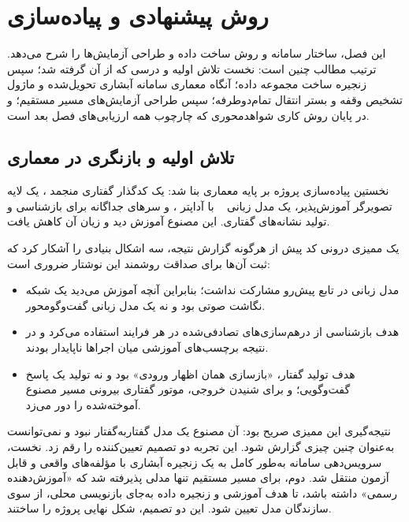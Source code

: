 
\chapter{روش پیشنهادی و پیاده‌سازی}
\label{ch:method}

این فصل، ساختار سامانه و روش ساخت داده و طراحی آزمایش‌ها را شرح می‌دهد.
ترتیب مطالب چنین است: نخست تلاش اولیه و درسی که از آن گرفته شد؛ سپس
زنجیره ساخت مجموعه داده؛ آنگاه معماری سامانه آبشاری تحویل‌شده و ماژول
تشخیص وقفه و بستر انتقال تمام‌دوطرفه؛ سپس طراحی آزمایش‌های مسیر مستقیم؛ و
در پایان روش کاری شواهد‌محوری که چارچوب همه ارزیابی‌های فصل بعد است.

\section{تلاش اولیه و بازنگری در معماری}
\label{sec:early-attempt}

نخستین پیاده‌سازی پروژه بر پایه معماری  بنا شد: یک کدگذار
گفتاری منجمد ، یک لایه تصویرگر آموزش‌پذیر، یک مدل زبانی
~\cite{qwen2025qwen25} با آداپتر ، و سرهای جداگانه برای بازشناسی و
تولید نشانه‌های گفتاری. این مصنوع آموزش دید و زیان آن کاهش یافت.

یک ممیزی درونی کد پیش از هرگونه گزارش نتیجه، سه اشکال بنیادی را آشکار کرد
که ثبت آن‌ها برای صداقت روشمند این نوشتار ضروری است:

\begin{itemize}
\item مدل زبانی در تابع پیش‌رو مشارکت نداشت؛ بنابراین آنچه آموزش می‌دید یک
      شبکه نگاشت صوتی بود و نه یک مدل زبانی گفت‌وگو‌محور.
\item هدف بازشناسی از درهم‌سازی‌های تصادفی‌شده در هر فرایند استفاده می‌کرد و
      در نتیجه برچسب‌های آموزشی میان اجراها ناپایدار بودند.
\item هدف تولید گفتار، «بازسازی همان اظهار ورودی» بود و نه تولید یک
      پاسخ گفت‌وگویی؛ و برای شنیدن خروجی، موتور گفتاری بیرونی مسیر مصنوع
      آموخته‌شده را دور می‌زد.

\end{itemize}

نتیجه‌گیری این ممیزی صریح بود: آن مصنوع یک مدل گفتار‌به‌گفتار نبود و
نمی‌توانست به‌عنوان چنین چیزی گزارش شود. این تجربه دو تصمیم تعیین‌کننده را
رقم زد. نخست، سرویس‌دهی سامانه به‌طور کامل به یک زنجیره آبشاری با مؤلفه‌های
واقعی و قابل آزمون منتقل شد. دوم، برای مسیر مستقیم تنها مدلی پذیرفته شد
که «آموزش‌دهنده رسمی» داشته باشد، تا هدف آموزشی و زنجیره داده به‌جای
بازنویسی محلی، از سوی سازندگان مدل تعیین شود. این دو تصمیم، شکل نهایی
پروژه را ساختند.

